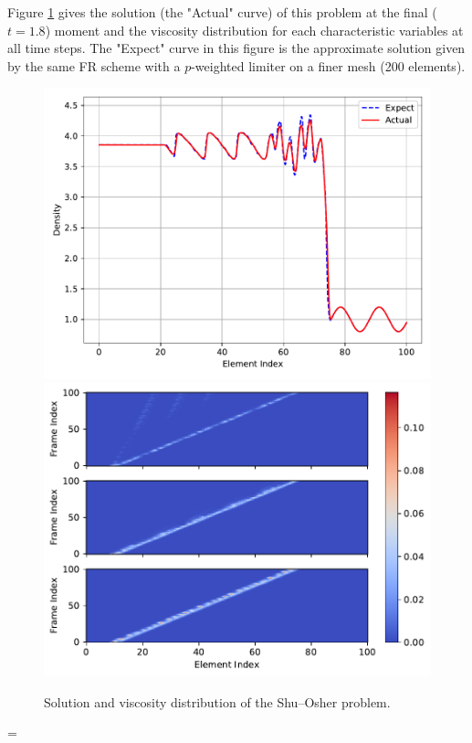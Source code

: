 \documentclass[10pt]{article}
\begin{document}
Figure \ref{fig:shu_osher} gives the solution (the "Actual" curve) of this problem at the final ($t=1.8$) moment and the viscosity distribution for each characteristic variables at all time steps.
The "Expect" curve in this figure is the approximate solution given by the same FR scheme with a $p$-weighted limiter on a finer mesh (200 elements).
\begin{figure}[H]
  \centering
  \includegraphics[width=.49\textwidth]{./shu_osher/final/Frame100.pdf}
  \includegraphics[width=.49\textwidth]{./shu_osher/final/Viscosity.pdf}
  \caption{Solution and viscosity distribution of the Shu--Osher problem.}
  \label{fig:shu_osher}
\end{figure}

\bibspacing=


\end{document}
